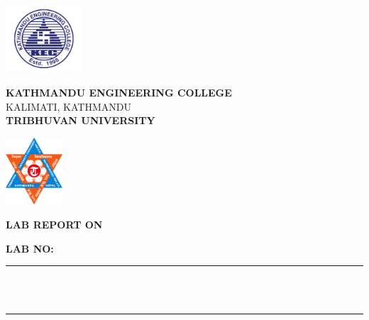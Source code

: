 
\begin{titlepage}
\begin{center}

\begin{minipage}{2.5cm}
	\begin{center}
		\includegraphics[height=2.5cm]{./logo/kec_logo.PNG}
	\end{center}
\end{minipage}\hfill
\begin{minipage}{10cm}
	\begin{center}
	\Large{\textbf{KATHMANDU ENGINEERING COLLEGE}}\\[0.1cm]
    \small{KALIMATI, KATHMANDU}\\[0.1cm]
    \textbf{TRIBHUVAN UNIVERSITY}
	\end{center}
\end{minipage}\hfill
\begin{minipage}{2.5cm}
	\begin{center}
		\includegraphics[height=2.5cm]{./logo/tu_logo.jpg}
	\end{center}
\end{minipage}

\vspace{3.5cm}

{\huge \bfseries \uppercase{lab report on} \\[0.5cm] }
{\large \bfseries \subjectname}

\vspace{2.5cm}
{\large \bfseries LAB NO: \labnumber}\\[0.5cm]

\rule{\linewidth}{0.3mm} \\[0.4cm]
{ \huge \bfseries\color{black} \labtopic \\[0.4cm] }
\rule{\linewidth}{0.3mm} \\[3cm]


\end{center}
\end{titlepage}
